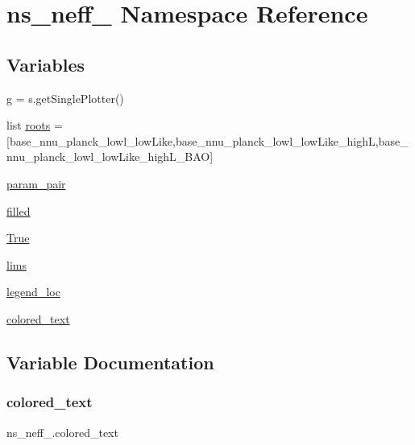 \hypertarget{namespacens__neff__0}{}\section{ns\+\_\+neff\+\_ Namespace Reference}
\label{namespacens__neff__0}
\subsection*{Variables}
\begin{DoxyCompactItemize}
\item 
\mbox{\hyperlink{namespacens__neff__0_a1e825e895fa51f98f1edaa5bbca5c912}{g}} = s.\+get\+Single\+Plotter()
\item 
list \mbox{\hyperlink{namespacens__neff__0_a6095796b0417a68d2081eaa0893cd982}{roots}} = \mbox{[}\textquotesingle{}base\+\_\+nnu\+\_\+planck\+\_\+lowl\+\_\+low\+Like\textquotesingle{},\textquotesingle{}base\+\_\+nnu\+\_\+planck\+\_\+lowl\+\_\+low\+Like\+\_\+highL\textquotesingle{},\textquotesingle{}base\+\_\+nnu\+\_\+planck\+\_\+lowl\+\_\+low\+Like\+\_\+high\+L\+\_\+\+B\+AO\textquotesingle{}\mbox{]}
\item 
\mbox{\hyperlink{namespacens__neff__0_a005d6e42e973121b39bdbb4d6b2bd328}{param\+\_\+pair}}
\item 
\mbox{\hyperlink{namespacens__neff__0_a954f692ee4323f9c5fe716197103611a}{filled}}
\item 
\mbox{\hyperlink{namespacens__neff__0_af1ccf4e387409e2d77055cb63f424032}{True}}
\item 
\mbox{\hyperlink{namespacens__neff__0_a6feae539f7763bf8a43f6e3994dfdf4f}{lims}}
\item 
\mbox{\hyperlink{namespacens__neff__0_ad9c0008f87d333b0fdf76238e2558914}{legend\+\_\+loc}}
\item 
\mbox{\hyperlink{namespacens__neff__0_a30e4dd254973c48d960eaae0c2bc53b6}{colored\+\_\+text}}
\end{DoxyCompactItemize}


\subsection{Variable Documentation}
\mbox{\label{namespacens__neff__0_a30e4dd254973c48d960eaae0c2bc53b6}} 
\subsubsection{\texorpdfstring{colored\+\_\+text}{colored\_text}}
{\footnotesize\ttfamily ns\+\_\+neff\+\_.\+colored\+\_\+text}

